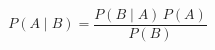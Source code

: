 \documentclass[12pt]{article}
\begin{document}
\begin{equation*}
  P(A \mid B) = \frac{P(B \mid A) \, P(A)}{P(B)}
\end{equation*}
\end{document}
